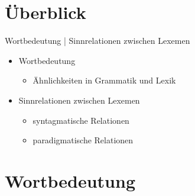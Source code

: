 \section{Überblick}

\begin{frame}{Wortbedeutung | Sinnrelationen zwischen Lexemen}
\onslide<+->
\begin{itemize}[<+->]
	\item		Wortbedeutung
	\begin{itemize}[<+->]
          \item Ähnlichkeiten in Grammatik und Lexik
              \end{itemize}
\Zeile
	\item 	Sinnrelationen zwischen Lexemen
	\begin{itemize}[<+->]
		\item 	syntagmatische Relationen
		\item		paradigmatische Relationen
	\end{itemize}
\end{itemize}
\end{frame}

\section{Wortbedeutung}

